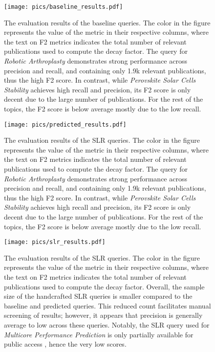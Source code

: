 \documentclass[%
  a4paper,fontsize=11pt,abstract=on,%
  oneside,BCOR=19mm,%
  final %
]{scrreprt}
\begin{document}
\begin{figure}[!h]
	\hspace*{-4cm}	
	\texttt{[image: pics/baseline\_results.pdf]}
	\caption[Predicted Queries Results]{The evaluation results of the baseline queries. The color in the figure represents the value of the metric in their respective columns, where the text on F2 metrics indicates the total number of relevant publications used to compute the decay factor. The query for \textit{Robotic Arthroplasty} demonstrates strong performance across precision and recall, and containing only 1.9k relevant publications, thus the high F2 score. In contrast, while \textit{Perovskite Solar Cells Stability} achieves high recall and precision, its F2 score is only decent due to the large number of publications. For the rest of the topics, the F2 score is below average mostly due to the low recall.}\label{fig:baseline-results}
\end{figure}

\begin{figure}
	\hspace*{-4cm}	
	\texttt{[image: pics/predicted\_results.pdf]}
	\caption[Baseline Queries Results]{The evaluation results of the SLR queries. The color in the figure represents the value of the metric in their respective columns, where the text on F2 metrics indicates the total number of relevant publications used to compute the decay factor. The query for \textit{Robotic Arthroplasty} demonstrates strong performance across precision and recall, and containing only 1.9k relevant publications, thus the high F2 score. In contrast, while \textit{Perovskite Solar Cells Stability} achieves high recall and precision, its F2 score is only decent due to the large number of publications. For the rest of the topics, the F2 score is below average mostly due to the low recall.}\label{fig:predicted-results}
\end{figure}

\begin{figure}
	\hspace*{-3cm}	
	\texttt{[image: pics/slr\_results.pdf]}
	\caption[SLR Queries Results]{The evaluation results of the SLR queries. The color in the figure represents the value of the metric in their respective columns, where the text on F2 metrics indicates the total number of relevant publications used to compute the decay factor. Overall, the sample size of the handcrafted SLR queries is smaller compared to the baseline and predicted queries. This reduced count facilitates manual screening of results; however, it appears that precision is generally average to low across these queries. Notably, the SLR query used for \textit{Multicore Performance Prediction} is only partially available for public access \autocite{Frank2017}, hence the very low scores.} \label{fig:slr-results}

\end{figure}

\printbibliography


\end{document}
